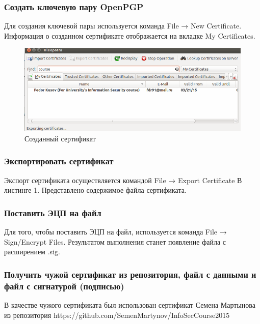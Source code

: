 \documentclass[12pt,a4paper]{article}
\begin{document}
\subsubsection{Создать ключевую пару OpenPGP}
Для создания ключевой пары используется команда File → New Certificate. Информация о созданном сертификате отображается на вкладке My Certificates.
\begin{figure}[h!]
\centering
\includegraphics[scale=0.6]{resources/kleo_sertificates.png}
\caption{Созданный сертификат}
\end{figure}
\subsubsection{Экспортировать сертификат}
Экспорт сертификата осуществляется командой File → Export Certificate В листинге 1. Представлено содержимое файла-сертификата.

\subsubsection{Поставить ЭЦП на файл}
Для того, чтобы поставить ЭЦП на файл, используется команда File → Sign/Encrypt Files. Результатом выполнения станет появление файла с расширением .sig.
\subsubsection{Получить чужой сертификат из репозитория, файл с данными и файл с сигнатурой (подписью)}
В качестве чужого сертификата был использован сертификат Семена Мартынова из репозитория  https://github.com/SemenMartynov/InfoSecCourse2015
\end{document}

